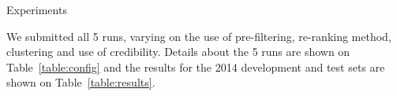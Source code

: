 
\begin{section}{Experiments}

We submitted all 5 runs, varying on the use of pre-filtering, re-ranking method, clustering and use of credibility.
Details about the 5 runs are shown on Table~\ref{table:config} and the results for the 2014 development and test sets are shown on Table~\ref{table:results}.

%
%

\end{section}

